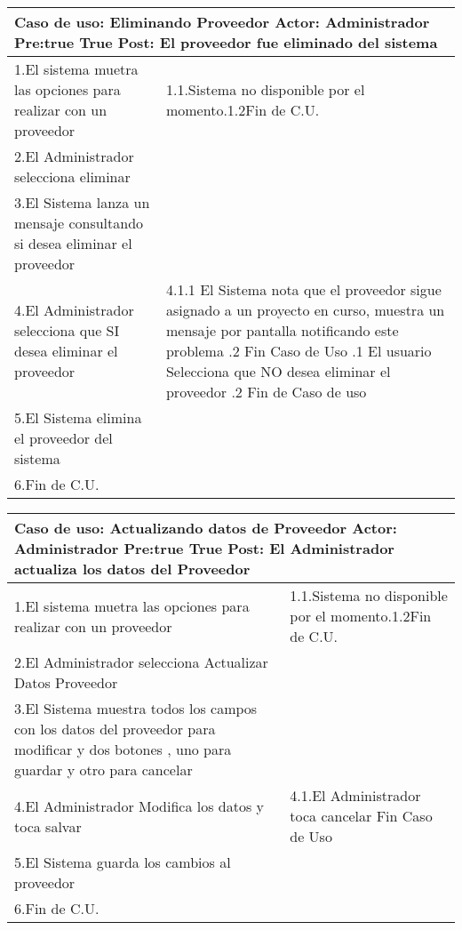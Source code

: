 \begin{tabular}{|p{8cm}|p{8cm}|}
  \hline
  \multicolumn{2}{|p{16cm}|}{
	      \textbf{Caso de uso:} Eliminando Proveedor \newline
		  \textbf{Actor:} Administrador\newline
		  \textbf{Pre:true }  True\newline
		  \textbf{Post:} El proveedor fue eliminado del sistema
  }\\
  \hline
		1.El sistema  muetra las opciones para realizar con un proveedor & 1.1.Sistema no  disponible por el momento.\newline 1.2Fin de C.U.\\
		\hline
		2.El Administrador selecciona eliminar&	\\
		\hline
		3.El Sistema lanza un mensaje consultando si desea eliminar el proveedor &  \\
		\hline
		4.El Administrador selecciona que SI desea eliminar el proveedor & 4.1.1 El Sistema nota que el proveedor sigue asignado a un proyecto en curso, muestra un mensaje por pantalla notificando este problema \newline 4.1.2 Fin Caso de Uso \newline 4.2.1 El usuario Selecciona que NO desea eliminar el proveedor \newline4.2.2 Fin de Caso de uso\\
		\hline
		5.El Sistema elimina el proveedor del sistema &  \\
		\hline
		6.Fin de C.U.& \\
		\hline

  \hline
\end{tabular}
\newline
\begin{tabular}{|p{8cm}|p{8cm}|}
  \hline
  \multicolumn{2}{|p{16cm}|}{
	      \textbf{Caso de uso:} Actualizando datos de Proveedor \newline
		  \textbf{Actor:} Administrador\newline
		  \textbf{Pre:true }  True\newline
		  \textbf{Post:} El Administrador actualiza los datos del Proveedor
  }\\
  \hline
		1.El sistema  muetra las opciones para realizar con un proveedor & 1.1.Sistema no  disponible por el momento.\newline 1.2Fin de C.U.\\
		\hline
		2.El Administrador selecciona Actualizar Datos Proveedor&	\\
		\hline
		3.El Sistema muestra todos los campos con los datos del proveedor para modificar y dos botones , uno para guardar y otro para cancelar&  \\
		\hline
		4.El Administrador Modifica los datos y toca salvar & 4.1.El Administrador toca cancelar \newline 4.2 Fin Caso de Uso \\
		\hline
		5.El Sistema guarda los cambios al proveedor &  \\
		\hline
		6.Fin de C.U.& \\
		\hline
  \hline
\end{tabular}
